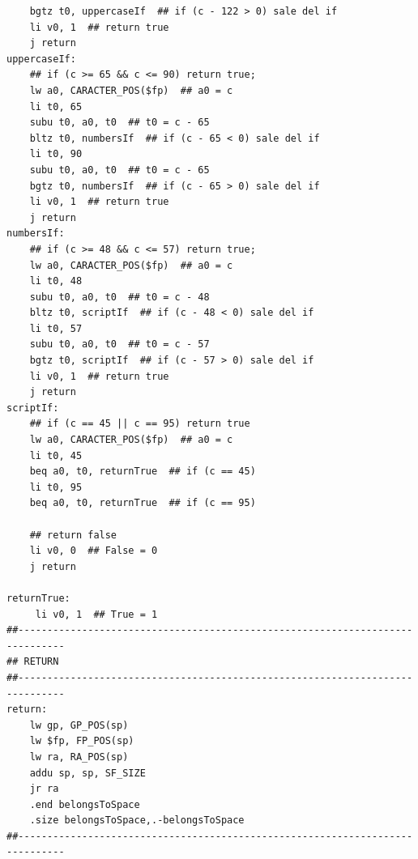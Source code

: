 \documentclass[a4paper,10pt]{article}
\begin{document}
\begin{lstlisting}
    bgtz t0, uppercaseIf  ## if (c - 122 > 0) sale del if
    li v0, 1  ## return true
    j return
uppercaseIf:
    ## if (c >= 65 && c <= 90) return true;
    lw a0, CARACTER_POS($fp)  ## a0 = c
    li t0, 65
    subu t0, a0, t0  ## t0 = c - 65
    bltz t0, numbersIf  ## if (c - 65 < 0) sale del if
    li t0, 90
    subu t0, a0, t0  ## t0 = c - 65
    bgtz t0, numbersIf  ## if (c - 65 > 0) sale del if
    li v0, 1  ## return true
    j return
numbersIf:
    ## if (c >= 48 && c <= 57) return true;
    lw a0, CARACTER_POS($fp)  ## a0 = c
    li t0, 48
    subu t0, a0, t0  ## t0 = c - 48
    bltz t0, scriptIf  ## if (c - 48 < 0) sale del if
    li t0, 57
    subu t0, a0, t0  ## t0 = c - 57
    bgtz t0, scriptIf  ## if (c - 57 > 0) sale del if
    li v0, 1  ## return true
    j return
scriptIf:
    ## if (c == 45 || c == 95) return true
    lw a0, CARACTER_POS($fp)  ## a0 = c
    li t0, 45
    beq a0, t0, returnTrue  ## if (c == 45)
    li t0, 95
    beq a0, t0, returnTrue  ## if (c == 95)

    ## return false
    li v0, 0  ## False = 0
    j return

returnTrue:
     li v0, 1  ## True = 1
##------------------------------------------------------------------------------
## RETURN
##------------------------------------------------------------------------------
return:
    lw gp, GP_POS(sp)
    lw $fp, FP_POS(sp)
    lw ra, RA_POS(sp)
    addu sp, sp, SF_SIZE
    jr ra
    .end belongsToSpace
    .size belongsToSpace,.-belongsToSpace
##------------------------------------------------------------------------------
            
            \end{lstlisting}
            
\end{document}
